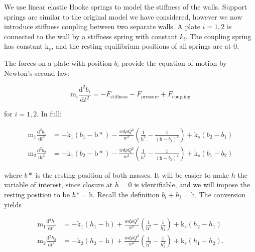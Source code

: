 \documentclass{article}
\begin{document}
We use linear elastic Hooke springs to model the stiffness of the walls.
Support springs are similar to the original model we have considered,
however we now introduce stiffness coupling between two separate walls.
A plate $i = 1,2$ is connected to the wall by a stiffness spring with constant ${k}_i$.
The coupling spring has constant $\mathrm{k}_s$, and the resting equilibrium positions of all springs are at $0$.

The forces on a plate with position $b_i$ provide the equation of motion by Newton's second law:

\begin{equation}
    \mathrm{m}_i\frac{\mathrm{d}^2 b_i}{\mathrm{d}t^2} = -F_\mathrm{stiffness} - F_\mathrm{pressure} + F_\mathrm{coupling}
\end{equation}

\noindent for $i=1,2$. In full:

\begin{equation}
    \begin{aligned}
        \mathrm{m}_1\frac{\mathrm{d}^2 b_1}{\mathrm{d}t^2} &= -\mathrm{k}_1(b_1 - \mathrm{b}*) - \frac{wd\rho Q^2}{w^2}\left(\frac{1}{\mathrm{h}^2} - \frac{1}{(\mathrm{h}-b_1)^2} \right) + \mathrm{k}_s(b_2-b_1) \\
        \mathrm{m}_2\frac{\mathrm{d}^2 b_2}{\mathrm{d}t^2} &= -\mathrm{k}_1(b_2 - \mathrm{b}*) - \frac{wd\rho Q^2}{w^2}\left(\frac{1}{\mathrm{h}^2} - \frac{1}{(\mathrm{h}-b_2)^2} \right) + \mathrm{k}_s(b_1-b_2)
    \end{aligned}
\end{equation}

\noindent where $b*$ is the resting position of both masses. It will be easier to make $h$ the variable of interest, since closure at $h=0$ is identifiable,
and we will impose the resting position to be $h* = \mathrm{h}$. Recall the definition $b_i + h_i = \mathrm{h}$. The conversion yields

\begin{equation}
    \begin{aligned}
        \mathrm{m}_1\frac{\mathrm{d}^2 h_1}{\mathrm{d}t^2} &= -\mathrm{k}_1(h_1 - \mathrm{h}) + \frac{wd\rho Q^2}{w^2}\left(\frac{1}{\mathrm{h}^2} - \frac{1}{h_1^2} \right) + \mathrm{k}_s(h_2-h_1) \\
        \mathrm{m}_2\frac{\mathrm{d}^2 h_2}{\mathrm{d}t^2} &= -\mathrm{k}_2(h_2 - \mathrm{h}) + \frac{wd\rho Q^2}{w^2}\left(\frac{1}{\mathrm{h}^2} - \frac{1}{h_2^2} \right) + \mathrm{k}_s(h_1-h_2).
    \end{aligned}
\end{equation}
\end{document}
